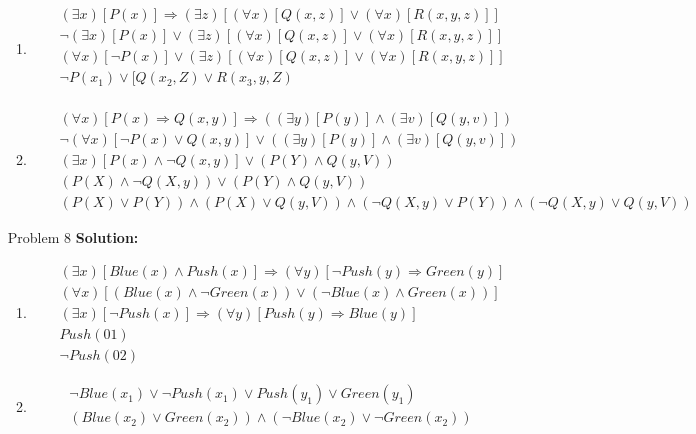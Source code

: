 \normalfont\documentclass[letterpaper,11pt]{article}
\begin{document}
\begin{enumerate}
\begin{enumerate}
	\item 
	\begin{eqnarray*}
	&&(\exists x)[P(x)] \Rightarrow (\exists z)[(\forall x)[Q(x,z)] \lor (\forall x)[R(x,y,z)]]\\
	&&\neg (\exists x)[P(x)] \lor (\exists z)[(\forall x)[Q(x,z)] \lor (\forall x)[R(x,y,z)]]\\
	&&(\forall x) [\neg P(x)] \lor (\exists z)[(\forall x)[Q(x,z)] \lor (\forall x)[R(x,y,z)]]\\
	&&\neg P(x_1) \lor [Q(x_2,Z) \lor R(x_3,y,Z)\\
	\end{eqnarray*}
	\item 
	\begin{eqnarray*}
		&& (\forall x)[P(x) \Rightarrow Q(x,y)] \Rightarrow ((\exists y)[P(y)] \land (\exists v)[Q(y,v)])\\
		&& \neg (\forall x)[\neg P(x) \lor Q(x,y)] \lor ((\exists y)[P(y)] \land (\exists v)[Q(y,v)])\\
		&& (\exists x)[ P(x) \land \neg Q(x,y)] \lor (P(Y) \land Q(y,V))\\
		&& (P(X) \land \neg Q(X,y)) \lor (P(Y) \land Q(y,V))\\
		&& (P(X) \lor P(Y)) \land (P(X) \lor Q(y,V))  \land (\neg Q(X,y) \lor P(Y)) \land (\neg Q(X,y) \lor Q(y,V))
	\end{eqnarray*}
\end{enumerate}
\item[Problem 8]\textbf{Solution:}\par
\begin{enumerate}
	\item
		\begin{eqnarray*} 
		&&(\exists x)[Blue(x)\land Push(x)] \Rightarrow (\forall y)[\neg Push(y)\Rightarrow Green(y)]\\
		&&(\forall x)[(Blue(x)\land \neg Green(x)) \lor (\neg Blue(x) \land Green(x)) ]\\
		&&(\exists x)[\neg Push(x)] \Rightarrow (\forall y)[Push(y)\Rightarrow Blue(y)]\\
		&&Push(01)\\
		&&\neg Push(02)
		\end{eqnarray*}
	\item
	\begin{eqnarray*} 
		&&\neg Blue(x_1)\lor \neg Push(x_1) \lor Push(y_1) \lor Green(y_1)\\
		&&(Blue(x_2)\lor Green(x_2)) \land (\neg Blue(x_2) \lor \neg Green(x_2))\\

\end{eqnarray*}
\end{enumerate}
\end{enumerate}
\end{document}
